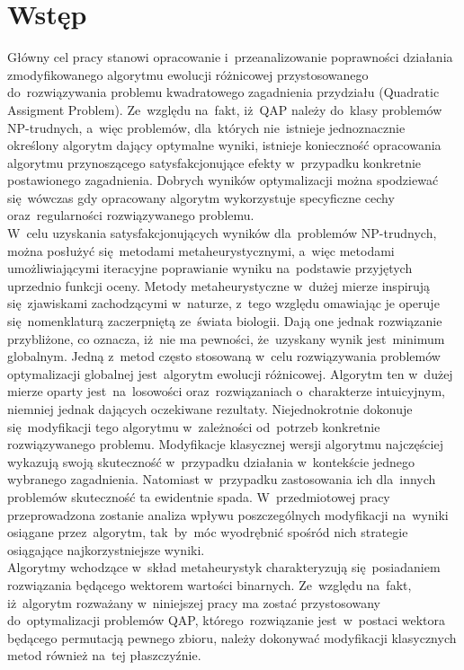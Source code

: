 \chapter{Wstęp}
Główny cel pracy stanowi opracowanie i~przeanalizowanie poprawności działania zmodyfikowanego algorytmu ewolucji różnicowej przystosowanego do~rozwiązywania problemu kwadratowego zagadnienia przydziału (Quadratic Assigment Problem). Ze~względu na~fakt, iż~QAP należy do~klasy problemów NP-trudnych, a~więc problemów, dla~których nie~istnieje jednoznacznie określony algorytm dający optymalne wyniki, istnieje konieczność opracowania algorytmu przynoszącego satysfakcjonujące efekty w~przypadku konkretnie postawionego zagadnienia. Dobrych wyników optymalizacji można spodziewać się~wówczas gdy opracowany algorytm wykorzystuje specyficzne cechy oraz~regularności rozwiązywanego problemu.\\ 
W~celu uzyskania satysfakcjonujących wyników dla~problemów NP-trudnych, można posłużyć się~metodami metaheurystycznymi, a~więc metodami umożliwiającymi iteracyjne poprawianie wyniku na~podstawie przyjętych uprzednio funkcji oceny. Metody metaheurystyczne w~dużej mierze inspirują się~zjawiskami zachodzącymi w~naturze, z~tego względu omawiając je operuje się~nomenklaturą zaczerpniętą ze~świata biologii. Dają one jednak rozwiązanie przybliżone, co oznacza, iż~nie ma pewności, że~uzyskany wynik jest~minimum globalnym. Jedną z~metod często stosowaną w~celu rozwiązywania problemów optymalizacji globalnej jest~algorytm ewolucji różnicowej. Algorytm ten w~dużej mierze oparty jest~na~losowości oraz~rozwiązaniach o~charakterze intuicyjnym, niemniej jednak dających oczekiwane rezultaty. Niejednokrotnie dokonuje się~modyfikacji tego algorytmu w~zależności od~potrzeb konkretnie rozwiązywanego problemu. Modyfikacje klasycznej wersji algorytmu najczęściej wykazują swoją skuteczność w~przypadku działania w~kontekście jednego wybranego zagadnienia. Natomiast w~przypadku zastosowania ich dla~innych problemów skuteczność ta ewidentnie spada. W~przedmiotowej pracy przeprowadzona zostanie analiza wpływu poszczególnych modyfikacji na~wyniki osiągane przez~algorytm, tak~by~móc wyodrębnić spośród nich strategie osiągające najkorzystniejsze wyniki.\\
Algorytmy wchodzące w~skład metaheurystyk charakteryzują się~posiadaniem rozwiązania będącego wektorem wartości binarnych. Ze~względu na~fakt, iż~algorytm rozważany w~niniejszej pracy ma zostać przystosowany do~optymalizacji problemów QAP, którego~rozwiązanie jest~w~postaci wektora będącego permutacją pewnego zbioru, należy dokonywać modyfikacji klasycznych metod również na~tej płaszczyźnie.\\
